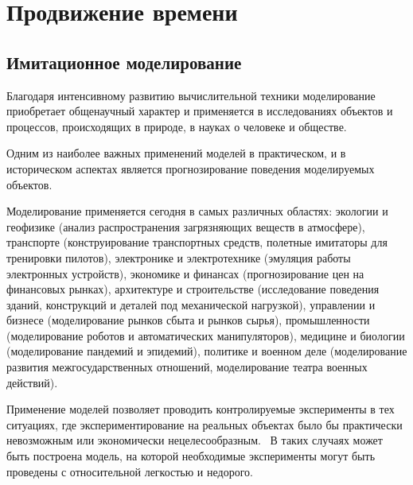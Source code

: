\chapter{Продвижение времени} \label{chapt1}

\section{Имитационное моделирование} \label{sect1}


Благодаря интенсивному развитию вычислительной техники моделирование приобретает общенаучный характер и применяется в исследованиях объектов и процессов, происходящих в природе, в науках о человеке и обществе.

Одним из наиболее важных применений моделей в практическом, и в историческом аспектах является прогнозирование поведения моделируемых объектов.

Моделирование применяется сегодня в самых различных областях: экологии и геофизике (анализ распространения загрязняющих веществ в атмосфере), транспорте (конструирование транспортных средств, полетные имитаторы для тренировки пилотов), электронике и электротехнике (эмуляция работы электронных устройств), экономике и финансах (прогнозирование цен на финансовых рынках), архитектуре и строительстве (исследование поведения зданий, конструкций и деталей под механической нагрузкой), управлении и бизнесе (моделирование рынков сбыта и рынков сырья), промышленности (моделирование роботов и автоматических манипуляторов), медицине и биологии (моделирование пандемий и эпидемий), политике и военном деле (моделирование развития межгосударственных отношений, моделирование театра военных действий).


Применение моделей позволяет проводить контролируемые эксперименты в тех ситуациях, где экспериментирование на реальных объектах было бы практически невозможным или экономически нецелесообразным.~\cite{Shennon} В таких случаях может быть построена модель, на которой необходимые эксперименты могут быть проведены с относительной легкостью и недорого.





